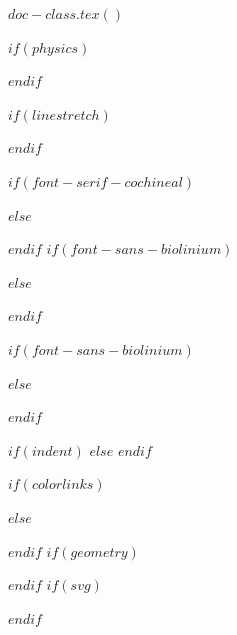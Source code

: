 $doc-class.tex()$

\usepackage{titletoc}
\newcommand\DoToC{%
  \startcontents
  \printcontents{}{1}{\textbf{Online Supporting Information}\vskip3pt\hrule\vskip5pt}
  \vskip3pt\hrule\vskip5pt
}



\usepackage{mathtools}
\usepackage{amsmath}
\usepackage{amsthm}
\usepackage{amssymb}
$if(physics)$
\usepackage[italicdiff]{physics}
$endif$

$if(linestretch)$
\usepackage{setspace}
$endif$
\usepackage{iftex}
\ifPDFTeX
  \usepackage[$if(fontenc)$$fontenc$$else$OT1,T1$endif$]{fontenc}
  \usepackage[utf8]{inputenc}
  \usepackage{textcomp} %
  $if(font-serif-cochineal)$
  \usepackage[p,osf,swashQ]{cochineal}
  \usepackage[cochineal,vvarbb]{newtxmath}
  $else$
  \usepackage{newpxtext}
  \usepackage{mathpazo}
  $endif$
  $if(font-sans-biolinium)$
  \usepackage[scale=0.95]{biolinum}
  $else$
  \usepackage[scaled]{helvet}
  $endif$
  \usepackage[scale=0.95,varl]{inconsolata}
\else %
  \usepackage[scale=0.95,varl]{inconsolata}
  \usepackage{newpxtext}
  \usepackage{mathpazo}
  $if(font-sans-biolinium)$
  \usepackage[scale=0.95]{biolinum}
  $else$
  \usepackage[scaled]{helvet}
  $endif$
\fi
\ifLuaTeX
  \usepackage{selnolig}  %
\fi
{}

$if(indent)$
$else$
\setlength{\parindent}{0pt}
\setlength{\parskip}{6pt plus 2pt minus 1pt}
$endif$
\setlength{\emergencystretch}{3em} %
\flushbottom
\allowdisplaybreaks
\sloppy


$if(colorlinks)$
\usepackage[dvipsnames,svgnames,x11names]{xcolor}
$else$
\usepackage{xcolor}
$endif$
$if(geometry)$
\usepackage[$for(geometry)$$geometry$$sep$,$endfor$]{geometry}
$endif$
$if(svg)$
\usepackage{svg}
$endif$
\usepackage[format=plain,
  labelfont={bf,sf,small,singlespacing},
  textfont={sf,small,singlespacing},
  justification=justified,
  margin=0.25in]{caption}

